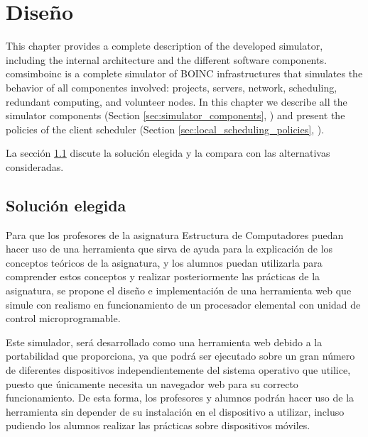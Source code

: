 \chead[]{}
\renewcommand{\headrulewidth}{0.5pt}

\lfoot[]{}
\cfoot[]{}
\rfoot[]{}
\renewcommand{\footrulewidth}{0pt}

\chapter{Diseño}
\label{ch:design}

This chapter provides a complete description of the developed simulator, including the internal architecture and the different software components. \gls{comsimboinc} is a complete simulator of BOINC infrastructures that simulates the behavior of all componentes involved: projects,  servers, network, \gls{scheduling}, redundant computing, and volunteer nodes. In this chapter we describe all the simulator components (Section \ref{sec:simulator_components}, \textit{}) and present the policies of the client scheduler (Section \ref{sec:local_scheduling_policies}, \textit{}).

La sección \ref{sec:solution_selection} discute la solución elegida y la compara con las alternativas consideradas. 

\section{Solución elegida}
\label{sec:solution_selection}

Para que los profesores de la asignatura Estructura de Computadores puedan hacer uso de una herramienta que sirva de ayuda para la explicación de los conceptos teóricos de la asignatura, y los alumnos puedan utilizarla para comprender estos conceptos y realizar posteriormente las prácticas de la asignatura, se propone el diseño e implementación de una herramienta web que simule con realismo en funcionamiento de un procesador elemental con unidad de control microprogramable.

Este simulador, será desarrollado como una herramienta web debido a la portabilidad que proporciona, ya que podrá ser ejecutado sobre un gran número de diferentes dispositivos independientemente del sistema operativo que utilice, puesto que únicamente necesita un navegador web para su correcto funcionamiento. De esta forma, los profesores y alumnos podrán hacer uso de la herramienta sin depender de su instalación en el dispositivo a utilizar, incluso pudiendo los alumnos realizar las prácticas sobre dispositivos móviles.

